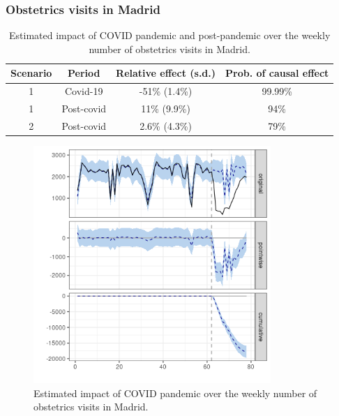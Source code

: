 \documentclass[9pt]{osa-supplemental-document}
\begin{document}
\subsubsection{Obstetrics visits in Madrid}\label{md}
\begin{table}[H]\caption{Estimated impact of COVID pandemic and post-pandemic over the weekly number of obstetrics visits in Madrid.}
  \centering
    \begin{tabular}{ |c|c|c|c| }
      \hline
   \textbf{Scenario} & \textbf{Period} & \textbf{Relative effect (s.d.)} & \textbf{Prob. of causal effect} \\ 
   \hline
   1 & Covid-19 & -51\% (1.4\%) & 99.99\% \\  
   1 & Post-covid & 11\% (9.9\%) & 94\% \\
   \hline   
   2 & Post-covid & 2.6\% (4.3\%) & 79\% \\
   \hline
  \end{tabular}
\end{table}

\begin{center}
  \begin{figure}[H]
    \includegraphics[width=9cm]{obstetrics_covid_Madrid.png}\caption{Estimated impact of COVID pandemic over the weekly number of obstetrics visits in Madrid.}
  \end{figure}
  \end{center}
  
\end{document}

